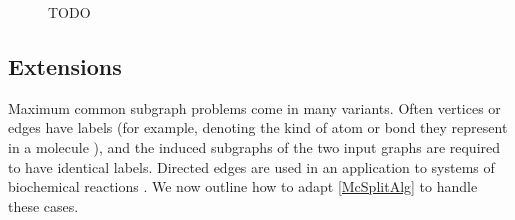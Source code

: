 \begin{figure}[h!]
    \centering
    \caption{TODO} \label{figure:bars10}
\end{figure}

\subsection{Extensions}\label{sec:extensions}

Maximum common subgraph problems come in many variants. Often
vertices or edges have labels (for example, denoting the kind of atom or bond they represent in
a molecule \cite{Ehrlich:2011}), and the induced subgraphs of the two input graphs are
required to have identical labels.  Directed edges are used in an application to systems
of biochemical reactions \cite{DAM2014}.
We now outline how to adapt \cref{McSplitAlg} to handle these cases.

